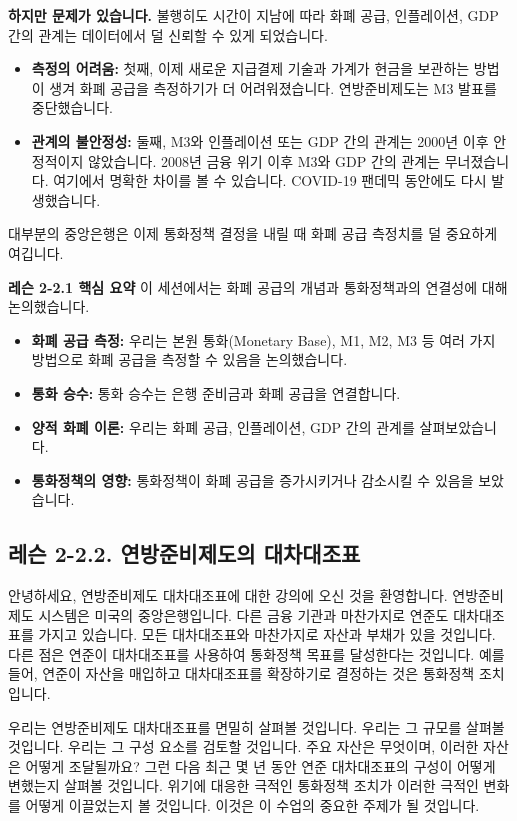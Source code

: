 \documentclass[11pt,a4paper]{book}
\theoremstyle{definition}
\begin{document}
\textbf{하지만 문제가 있습니다.}
불행히도 시간이 지남에 따라 화폐 공급, 인플레이션, GDP 간의 관계는 데이터에서 덜 신뢰할 수 있게 되었습니다.
\begin{itemize}
    \item \textbf{측정의 어려움:} 첫째, 이제 새로운 지급결제 기술과 가계가 현금을 보관하는 방법이 생겨 화폐 공급을 측정하기가 더 어려워졌습니다. 연방준비제도는 M3 발표를 중단했습니다.
    \item \textbf{관계의 불안정성:} 둘째, M3와 인플레이션 또는 GDP 간의 관계는 2000년 이후 안정적이지 않았습니다. 2008년 금융 위기 이후 M3와 GDP 간의 관계는 무너졌습니다. 여기에서 명확한 차이를 볼 수 있습니다. COVID-19 팬데믹 동안에도 다시 발생했습니다.
\end{itemize}
대부분의 중앙은행은 이제 통화정책 결정을 내릴 때 화폐 공급 측정치를 덜 중요하게 여깁니다.

\begin{summarybox}
\textbf{레슨 2-2.1 핵심 요약}
이 세션에서는 화폐 공급의 개념과 통화정책과의 연결성에 대해 논의했습니다.
\begin{itemize}
    \item \textbf{화폐 공급 측정:} 우리는 본원 통화(Monetary Base), M1, M2, M3 등 여러 가지 방법으로 화폐 공급을 측정할 수 있음을 논의했습니다.
    \item \textbf{통화 승수:} 통화 승수는 은행 준비금과 화폐 공급을 연결합니다.
    \item \textbf{양적 화폐 이론:} 우리는 화폐 공급, 인플레이션, GDP 간의 관계를 살펴보았습니다.
    \item \textbf{통화정책의 영향:} 통화정책이 화폐 공급을 증가시키거나 감소시킬 수 있음을 보았습니다.
\end{itemize}
\end{summarybox}


\subsection{레슨 2-2.2. 연방준비제도의 대차대조표}

안녕하세요, 연방준비제도 대차대조표에 대한 강의에 오신 것을 환영합니다. 연방준비제도 시스템은 미국의 중앙은행입니다. 다른 금융 기관과 마찬가지로 연준도 대차대조표를 가지고 있습니다. 모든 대차대조표와 마찬가지로 자산과 부채가 있을 것입니다. 다른 점은 연준이 대차대조표를 사용하여 통화정책 목표를 달성한다는 것입니다. 예를 들어, 연준이 자산을 매입하고 대차대조표를 확장하기로 결정하는 것은 통화정책 조치입니다.

우리는 연방준비제도 대차대조표를 면밀히 살펴볼 것입니다. 우리는 그 규모를 살펴볼 것입니다. 우리는 그 구성 요소를 검토할 것입니다. 주요 자산은 무엇이며, 이러한 자산은 어떻게 조달될까요? 그런 다음 최근 몇 년 동안 연준 대차대조표의 구성이 어떻게 변했는지 살펴볼 것입니다. 위기에 대응한 극적인 통화정책 조치가 이러한 극적인 변화를 어떻게 이끌었는지 볼 것입니다. 이것은 이 수업의 중요한 주제가 될 것입니다.
\end{document}
